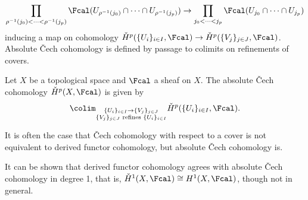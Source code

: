 $$\prod_{\rho^{-1}(j_{0})<\dots<\rho^{-1}(j_{p})}\Fcal(U_{\rho^{-1}(j_{0})}\cap\dots\cap U_{\rho^{-1}(j_{p})})\to\prod_{j_{0}<\dots<j_{p}}\Fcal(U_{j_{0}}\cap\dots\cap U_{j_{p}})$$
inducing a map on cohomology $\check{H}^{p}(\{U_{i}\}_{i\in I},\Fcal)\to\check{H}^{p}(\{V_{j}\}_{j\in J},\Fcal)$. Absolute \v{C}ech cohomology is defined by passage to colimits on refinements of covers. 
\begin{definition}\label{def: absolute Cech cohomology}
    Let $X$ be a topological space and $\Fcal$ a sheaf on $X$. The absolute \v{C}ech cohomology $\check{H}^{p}(X,\Fcal)$ is given by 
    $$\colim_{\substack{\{U_{i}\}_{i\in I}\to\{V_{j}\}_{j\in J} \\ \{V_{j}\}_{j\in J} \text{ refines } \{U_{i}\}_{i\in I}}}\check{H}^{p}(\{U_{i}\}_{i\in I},\Fcal).$$
\end{definition}
\begin{remark}
    It is often the case that \v{C}ech cohomology with respect to a cover is not equivalent to derived functor cohomology, but absolute \v{C}ech cohomology is.
\end{remark}
\begin{remark}\label{rmk: cech and derived functor in degree 1}
    It can be shown that derived functor cohomology agrees with absolute \v{C}ech cohomology in degree 1, that is, $\check{H}^{1}(X,\Fcal)\cong H^{1}(X,\Fcal)$, though not in general. 
\end{remark}

